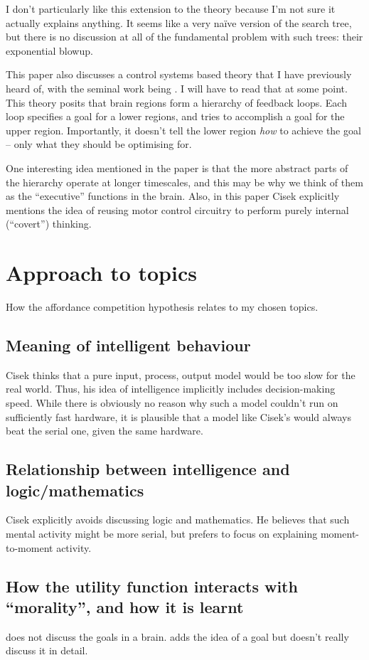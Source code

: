 \documentclass[10pt,a4paper]{article}
\newcommand{\nquote}[1]{``{#1}''}
\begin{document}
I don't particularly like this extension to the theory because I'm not sure it actually explains anything. It seems like a very na\"{i}ve version of the search tree, but there is no discussion at all of the fundamental problem with such trees: their exponential blowup.

This paper also discusses a control systems based theory that I have previously heard of, with the seminal work being \cite{powers}. I will have to read that at some point. This theory posits that brain regions form a hierarchy of feedback loops. Each loop specifies a goal for a lower regions, and tries to accomplish a goal for the upper region. Importantly, it doesn't tell the lower region \emph{how} to achieve the goal -- only what they should be optimising for.

One interesting idea mentioned in the paper is that the more abstract parts of the hierarchy operate at longer timescales, and this may be why we think of them as the \nquote{executive} functions in the brain. Also, in this paper Cisek explicitly mentions the idea of reusing motor control circuitry to perform purely internal (\nquote{covert}) thinking.

\section{Approach to topics}
How the affordance competition hypothesis relates to my chosen topics.

\subsection{Meaning of intelligent behaviour}
Cisek thinks that a pure input, process, output model would be too slow for the real world. Thus, his idea of intelligence implicitly includes decision-making speed. While there is obviously no reason why such a model couldn't run on sufficiently fast hardware, it is plausible that a model like Cisek's would always beat the serial one, given the same hardware.

\subsection{Relationship between intelligence and logic/mathematics}
Cisek explicitly avoids discussing logic and mathematics. He believes that such mental activity might be more serial, but prefers to focus on explaining moment-to-moment activity.

\subsection{How the utility function interacts with \nquote{morality}, and how it is learnt}
\cite{cisek2007} does not discuss the goals in a brain. \cite{cisek2012} adds the idea of a goal but doesn't really discuss it in detail.
\end{document}

